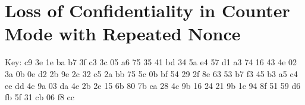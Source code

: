 \section{Loss of Confidentiality in Counter Mode with Repeated Nonce}


Key: c9 3e 1e ba b7 3f c3 3c 05 a6 75 35 41 bd 34 5a e4 57 d1 a3 74 16 43 4e 02 3a 0b 0e d2 2b 9e 2c 32 c5 2a bb 75 5c 0b bf 54 29 2f 8e 63 53 b7 f3 45 b3 a5 c4 ee dd 4c 9a 03 da 4e 2b 2e 15 6b 80 7b ca 28 4c 9b 16 24 21 9b 1e 94 8f 51 59 d6 fb 5f 31 cb 06 f8 cc